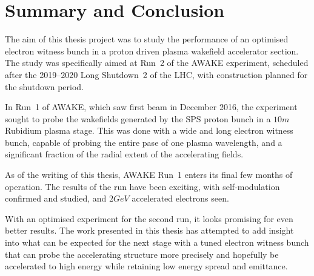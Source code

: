 %
%

\chapter{Summary and Conclusion}
\label{Ch:SnC}

The aim of this thesis project was to study the performance of an optimised electron witness bunch in a proton driven plasma wakefield accelerator section.
The study was specifically aimed at Run~2 of the AWAKE experiment, scheduled after the 2019--2020 Long Shutdown~2 of the LHC, with construction planned for the shutdown period.

In Run~1 of AWAKE, which saw first beam in December 2016, the experiment sought to probe the wakefields generated by the SPS proton bunch in a $10\unit{m}$ Rubidium plasma stage.
This was done with a wide and long electron witness bunch, capable of probing the entire pase of one plasma wavelength, and a significant fraction of the radial extent of the accelerating fields.

As of the writing of this thesis, AWAKE Run~1 enters its final few months of operation.
The results of the run have been exciting, with self-modulation confirmed and studied, and $2\unit{GeV}$ accelerated electrons seen. %

With an optimised experiment for the second run, it looks promising for even better results.
The work presented in this thesis has attempted to add insight into what can be expected for the next stage with a tuned electron witness bunch that can probe the accelerating structure more precisely and hopefully be accelerated to high energy while retaining low energy spread and emittance.


